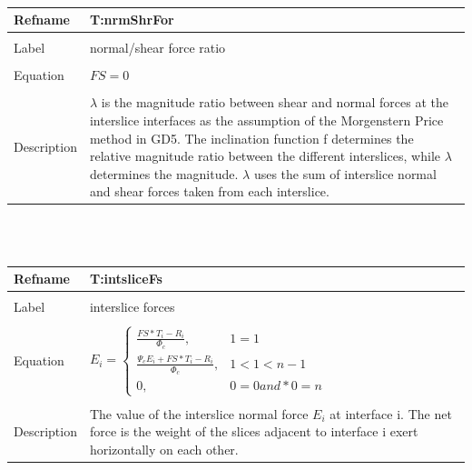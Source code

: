 \documentclass[12pt]{article}
\begin{document}
~\newline
\noindent \begin{minipage}{\textwidth}
\begin{tabular}{p{} p{}}
\toprule \textbf{Refname} & \textbf{T:nrmShrFor}
\label{T:nrmShrFor}
\\ \midrule \\
Label & normal/shear force ratio
\\ \midrule \\
Equation & $FS=0$
\\ \midrule \\
Description & $\lambda{}$ is the magnitude ratio between shear and normal forces at the interslice interfaces as the assumption of the Morgenstern Price method in GD5. The inclination function f determines the relative magnitude ratio between the different interslices, while $\lambda{}$ determines the magnitude. $\lambda{}$ uses the sum of interslice normal and shear forces taken from each interslice.
\\ \bottomrule \end{tabular}
\end{minipage}\\
~\newline
\noindent \begin{minipage}{\textwidth}
\begin{tabular}{p{} p{}}
\toprule \textbf{Refname} & \textbf{T:intsliceFs}
\label{T:intsliceFs}
\\ \midrule \\
Label & interslice forces
\\ \midrule \\
Equation & $E_{i}=\begin{cases}
\frac{FS*T_{i}-R_{i}}{\Phi{}_{c}}, & 1=1\\
\frac{\Psi{}_{c}E_{i}+FS*T_{i}-R_{i}}{\Phi{}_{c}}, & 1<1<n-1\\
0, & 0=0and*0=n
\end{cases}$
\\ \midrule \\
Description & The value of the interslice normal force $E_{i}$ at interface i. The net force is the weight of the slices adjacent to interface i exert horizontally on each other.
\\ \bottomrule \end{tabular}
\end{minipage}\\
~\newline
\end{document}

